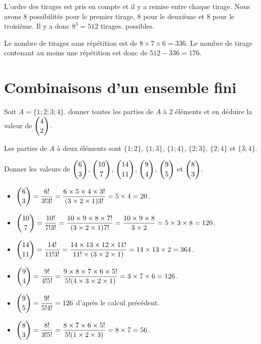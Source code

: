 \documentclass[11pt,fleqn, openany]{book} %
\begin{document}
\begin{solution}
L'ordre des tirages est pris en compte et il y a remise entre chaque tirage. Nous avons 8 possibilités pour le premier tirage, 8 pour le deuxième et 8 pour le troisième. Il y a donc $8^3=512$ tirages. possibles.

Le nombre de tirages sans répétition est de $8 \times 7 \times 6 =336$. Le nombre de tirage contenant au moins une répétition est donc de $512-336=176$.\newpage\end{solution}




\section*{Combinaisons d'un ensemble fini}

\begin{exercise}Soit $A=\{1;2;3;4\}$. donner toutes les parties de $A$ à 2 éléments et en déduire la valeur de $\dbinom{4}{2}$.\end{exercise}

\begin{solution}Les parties de $A$ à deux éléments sont $\{1;2\}$, $\{1;3\}$, $\{1;4\}$, $\{2;3\}$, $\{2;4\}$ et $\{3;4\}$.\end{solution}



\begin{exercise}Donner les valeurs de $\dbinom{6}{3}$, $\dbinom{10}{7}$, $\dbinom{14}{11}$,  $\dbinom{9}{4}$, $\dbinom{9}{5}$ et $\dbinom{8}{3}$.\end{exercise}

\begin{solution}\hspace{0pt}
 \begin{itemize}
 \item $\dbinom{6}{3}=\dfrac{6!}{3!3!}=\dfrac{6 \times 5 \times 4 \times 3!}{(3 \times 2 \times 1)3!}=5 \times 4 =20$.

\item $\dbinom{10}{7}=\dfrac{10!}{7!3!}=\dfrac{10 \times 9 \times 8 \times 7!}{(3 \times 2 \times 1)7!}=\dfrac{10 \times 9 \times 8}{3 \times 2} = 5 \times 3 \times 8 = 120$.

\item $\dbinom{14}{11}=\dfrac{14!}{11!3!}=\dfrac{14 \times 13 \times 12 \times 11!}{11! \times (3 \times 2 \times 1)}=14 \times 13 \times 2 = 364$.

\item $\dbinom{9}{4}=\dfrac{9!}{4!5!}=\dfrac{9 \times 8 \times 7 \times 6 \times 5!}{5!(4 \times 3 \times 2 \times 1)}=3 \times 7 \times 6 = 126$.

\item $\dbinom{9}{5}=\dfrac{9!}{5!4!}=126$ d'après le calcul précédent.

\item $\dbinom{8}{3}=\dfrac{8!}{3!5!}=\dfrac{8 \times 7 \times 6 \times 5!}{5!(1 \times 2 \times 3)}=8\times 7 = 56$.\end{itemize}
\end{solution}
\end{document}
